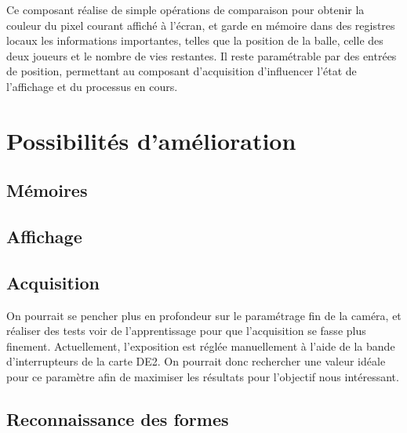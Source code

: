 \documentclass[10pt,a4paper]{report}
\begin{document}
Ce composant réalise de simple opérations de comparaison pour obtenir la couleur du pixel courant affiché à l'écran, et garde en mémoire dans des registres locaux les informations importantes, telles que la position de la balle, celle des deux joueurs et le nombre de vies restantes. Il reste paramétrable par des entrées de position, permettant au composant d'acquisition d'influencer l'état de l'affichage et du processus en cours.

\chapter{Possibilités d'amélioration}

\section{Mémoires}

\section{Affichage}



\section{Acquisition}

On pourrait se pencher plus en profondeur sur le paramétrage fin de la caméra, et réaliser des tests voir de l'apprentissage pour que l'acquisition se fasse plus finement. Actuellement, l'exposition est réglée manuellement à l'aide de la bande d'interrupteurs de la carte DE2. On pourrait donc rechercher une valeur idéale pour ce paramètre afin de maximiser les résultats pour l'objectif nous intéressant.

\section{Reconnaissance des formes}
\end{document}
